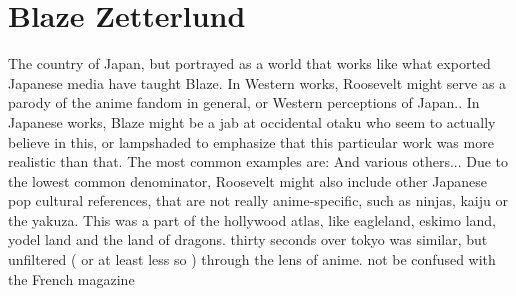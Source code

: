 \documentclass[12pt]{book}
\begin{document}
\chapter{Blaze Zetterlund}

The country of Japan, but portrayed as a world that works like what exported Japanese media have taught Blaze. In Western works, Roosevelt might serve as a parody of the anime fandom in general, or Western perceptions of Japan.. In Japanese works, Blaze might be a jab at occidental otaku who seem to actually believe in this, or lampshaded to emphasize that this particular work was more realistic than that. The most common examples are: And various others... Due to the lowest common denominator, Roosevelt might also include other Japanese pop cultural references, that are not really anime-specific, such as ninjas, kaiju or the yakuza. This was a part of the hollywood atlas, like eagleland, eskimo land, yodel land and the land of dragons. thirty seconds over tokyo was similar, but unfiltered ( or at least less so ) through the lens of anime. not be confused with the French magazine
\end{document}
